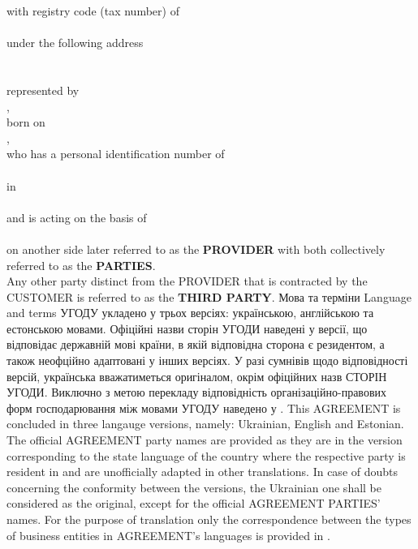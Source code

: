 \begin{Form}
\begin{paracol}{3}
{          with registry code (tax number) of\\
          \\
          under the following address\\
          \\
          \\
          represented by\\
          ,\\
          born on\\
          ,\\
          who has a personal identification number of\\
          \\
          in \\
          \\
          and is acting on the basis of\\
          \\
          on another side later referred to as the \textbf{PROVIDER} with both collectively referred to as the \textbf{PARTIES}.\\
          Any other party distinct from the PROVIDER that is contracted by the CUSTOMER is referred to as the \textbf{THIRD PARTY}.}
        {}
      \clause
        {Мова та терміни}
        {Language and terms}
        {}
        {УГОДУ укладено у трьох версіях: українською, англійською та естонською мовами. Офіційні назви сторін УГОДИ наведені у версії, що відповідає державній мові країни, в якій відповідна сторона є резидентом, а також неофційно адаптовані у інших версіях. У разі сумнівів щодо відповідності версій, українська вважатиметься оригіналом, окрім офіційних назв СТОРІН УГОДИ. Виключно з метою перекладу відповідність ор\-га\-ні\-за\-цій\-но-правових форм господарювання між мовами УГОДУ наведено у .}
        {This AGREEMENT is concluded in three langauge versions, namely: Ukrainian, English and Estonian. The official AGREEMENT party names are provided as they are in the version corresponding to the state language of the country where the respective party is resident in and are unofficially adapted in other translations. In case of doubts concerning the conformity between the versions, the Ukrainian one shall be considered as the original, except for the official AGREEMENT PARTIES' names. For the purpose of translation only the correspondence between the types of business entities in AGREEMENT's languages is provided in .}

\end{paracol}
\end{Form}
